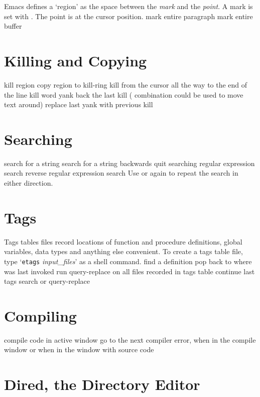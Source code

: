 Emacs defines a `region' as the space between the {\it mark\/} and
the {\it point}. A mark is set with .
The point is at the cursor position.
\askip
{} mark entire paragraph
 mark entire buffer

\section{Killing and Copying}

 kill region
 copy region to kill-ring
 kill from the cursor all the way to the end of the line
 kill word
 yank back the last kill ( combination could be
  used to move text around)
 replace last yank with previous kill

\section{Searching}

 search for a string
 search for a string backwards
 quit searching
 regular expression search
 reverse regular expression search
\askip
Use  or  again to repeat the search in either direction.

\section{Tags}

Tags tables files record locations of function and
procedure definitions, global variables, data types and anything
else convenient. To create a tags table file, type
`{\tt etags} {\it input\_files}' as a shell command.
\askip
{} find a definition
 pop back to where  was last invoked
 run query-replace on all files
  recorded in tags table
 continue last tags search or query-replace

\section{Compiling}

 compile code in active window
 go to the next compiler error, when in
  the compile window or
 when in the window with source code

\section{Dired, the Directory Editor}


